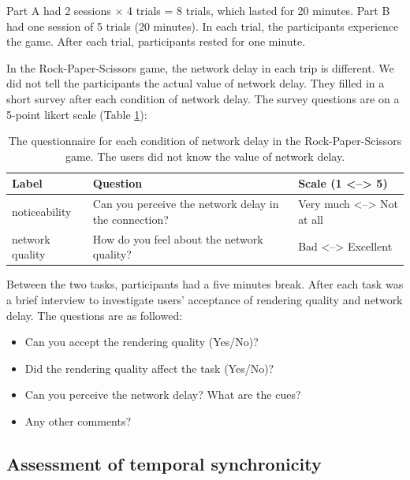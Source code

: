 Part A had 2 sessions $\times$ 4 trials = 8 trials, which lasted for 20 minutes. Part B had one session of 5 trials (20 minutes). In each trial, the participants experience the game. After each trial, participants rested for one minute.

In the Rock-Paper-Scissors game, the network delay in each trip is different. We did not tell the participants the actual value of network delay. They filled in a short survey after each condition of network delay. The survey questions are on a 5-point likert scale (Table \ref{tab:table_experiment}):

\begin{table} [!htbp]
\begin{tabular}{|p{}|p{}|p{}|}
\hline 
Label & Question & Scale (1 <--> 5) \\
\hline
noticeability & Can you perceive the network delay in the connection? & Very much <--> Not at all \\
\hline
network quality & How do you feel about the network quality? & Bad <--> Excellent \\
\hline
\end{tabular}
\caption{The questionnaire for each condition of network delay in the Rock-Paper-Scissors game. The users did not know the value of network delay.}
\label{tab:table_experiment}
\end{table}

Between the two tasks, participants had a five minutes break. After each task was a brief interview to investigate users' acceptance of rendering quality and network delay. The questions are as followed:

\begin{itemize}
    \item Can you accept the rendering quality (Yes/No)?
    
    \item Did the rendering quality affect the task (Yes/No)?

    \item Can you perceive the network delay? What are the cues?
    
    
    \item Any other comments?
\end{itemize}

\subsection{Assessment of temporal synchronicity}

